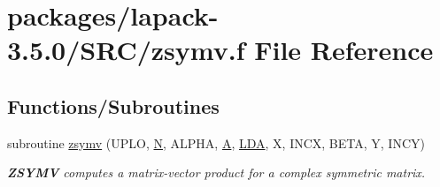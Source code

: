 \hypertarget{zsymv_8f}{}\section{packages/lapack-\/3.5.0/\+S\+R\+C/zsymv.f File Reference}
\label{zsymv_8f}
\subsection*{Functions/\+Subroutines}
\begin{DoxyCompactItemize}
\item 
subroutine \hyperlink{group__complex16SYauxiliary_gab9b336644e5cff134d305d70730e60ba}{zsymv} (U\+P\+L\+O, \hyperlink{polmisc_8c_a0240ac851181b84ac374872dc5434ee4}{N}, A\+L\+P\+H\+A, \hyperlink{classA}{A}, \hyperlink{example__user_8c_ae946da542ce0db94dced19b2ecefd1aa}{L\+D\+A}, X, I\+N\+C\+X, B\+E\+T\+A, Y, I\+N\+C\+Y)
\begin{DoxyCompactList}\small\item\em {\bfseries Z\+S\+Y\+M\+V} computes a matrix-\/vector product for a complex symmetric matrix. \end{DoxyCompactList}\end{DoxyCompactItemize}
